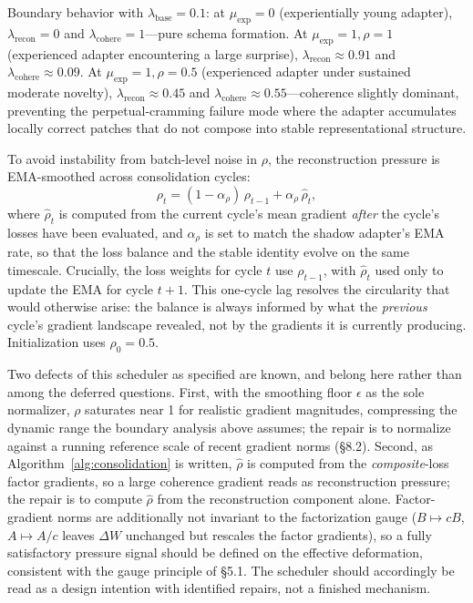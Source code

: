 \documentclass[11pt]{article}
\begin{document}
Boundary behavior with $\lambda_\text{base} = 0.1$: at $\mu_\text{exp} = 0$ (experientially young adapter), $\lambda_\text{recon} = 0$ and $\lambda_\text{cohere} = 1$---pure schema formation. At $\mu_\text{exp} = 1, \rho = 1$ (experienced adapter encountering a large surprise), $\lambda_\text{recon} \approx 0.91$ and $\lambda_\text{cohere} \approx 0.09$. At $\mu_\text{exp} = 1, \rho = 0.5$ (experienced adapter under sustained moderate novelty), $\lambda_\text{recon} \approx 0.45$ and $\lambda_\text{cohere} \approx 0.55$---coherence slightly dominant, preventing the perpetual-cramming failure mode where the adapter accumulates locally correct patches that do not compose into stable representational structure.

To avoid instability from batch-level noise in $\rho$, the reconstruction pressure is EMA-smoothed across consolidation cycles:
\begin{equation}
    \rho_t = (1 - \alpha_\rho)\,\rho_{t-1} + \alpha_\rho\,\hat{\rho}_t,
\end{equation}
where $\hat{\rho}_t$ is computed from the current cycle's mean gradient \emph{after} the cycle's losses have been evaluated, and $\alpha_\rho$ is set to match the shadow adapter's EMA rate, so that the loss balance and the stable identity evolve on the same timescale. Crucially, the loss weights for cycle $t$ use $\rho_{t-1}$, with $\hat{\rho}_t$ used only to update the EMA for cycle $t+1$. This one-cycle lag resolves the circularity that would otherwise arise: the balance is always informed by what the \emph{previous} cycle's gradient landscape revealed, not by the gradients it is currently producing. Initialization uses $\rho_0 = 0.5$.

Two defects of this scheduler as specified are known, and belong here rather than among the deferred questions. First, with the smoothing floor $\epsilon$ as the sole normalizer, $\rho$ saturates near 1 for realistic gradient magnitudes, compressing the dynamic range the boundary analysis above assumes; the repair is to normalize against a running reference scale of recent gradient norms (\S 8.2). Second, as Algorithm~\ref{alg:consolidation} is written, $\hat{\rho}$ is computed from the \emph{composite}-loss factor gradients, so a large coherence gradient reads as reconstruction pressure; the repair is to compute $\hat{\rho}$ from the reconstruction component alone. Factor-gradient norms are additionally not invariant to the factorization gauge ($B \mapsto cB$, $A \mapsto A/c$ leaves $\Delta W$ unchanged but rescales the factor gradients), so a fully satisfactory pressure signal should be defined on the effective deformation, consistent with the gauge principle of \S 5.1. The scheduler should accordingly be read as a design intention with identified repairs, not a finished mechanism.
\end{document}
